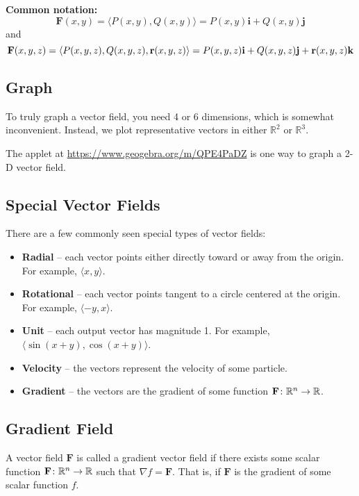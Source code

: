 \textbf{Common notation:}
\[ \mathbf{F}(x, y) = \langle P(x, y), Q(x, y) \rangle = P(x, y) \mathbf{i} + Q(x, y) \mathbf{j} \]
and
\[ \mathbf{F}(x, y, z) = \langle P(x, y, z), Q(x, y, z), \mathbf{r}(x, y, z) \rangle = P(x, y, z) \mathbf{i} + Q(x, y, z) \mathbf{j} + \mathbf{r}(x, y, z) \mathbf{k} \]

\subsection{Graph}
To truly graph a vector field, you need 4 or 6 dimensions, which is somewhat inconvenient. Instead, we plot representative vectors in either \( \mathbb{R}^2 \) or \( \mathbb{R}^3 \).

The applet at \url{https://www.geogebra.org/m/QPE4PaDZ} is one way to graph a 2-D vector field.

\subsection{Special Vector Fields}
There are a few commonly seen special types of vector fields:

\begin{itemize}
    \item \textbf{Radial} – each vector points either directly toward or away from the origin. For example, \( \langle x, y \rangle \).
    \item \textbf{Rotational} – each vector points tangent to a circle centered at the origin. For example, \( \langle -y, x \rangle \).
    \item \textbf{Unit} – each output vector has magnitude 1. For example, \( \langle \sin(x + y), \cos(x + y) \rangle \).
    \item \textbf{Velocity} – the vectors represent the velocity of some particle.
    \item \textbf{Gradient} – the vectors are the gradient of some function \( \mathbf{F} \colon \mathbb{R}^n \to \mathbb{R} \).
\end{itemize}

\subsection{Gradient Field}
A vector field \( \mathbf{F} \) is called a gradient vector field if there exists some scalar function \( \mathbf{F} \colon \mathbb{R}^n \to \mathbb{R} \) such that \( \nabla f = \mathbf{F} \). That is, if \( \mathbf{F} \) is the gradient of some scalar function \( f \).

